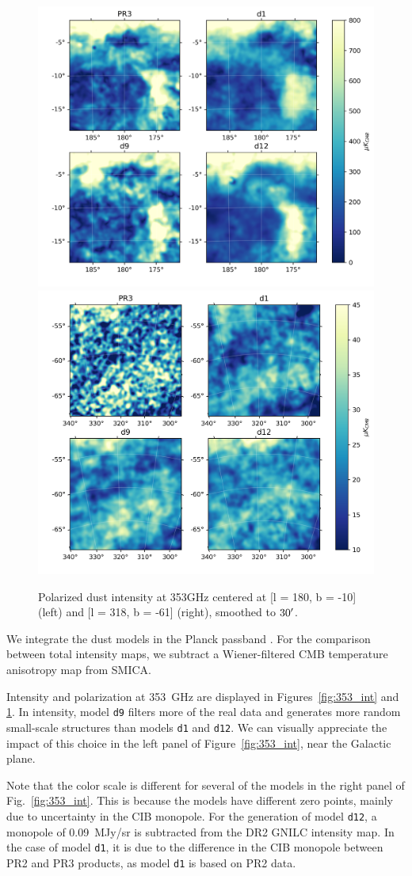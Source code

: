 \documentclass[twocolumn]{aastex631}
\begin{document}
\begin{figure}[t!]
    \centering
    \includegraphics[height=0.41\textwidth]{figures/pol_gal_plane_smooth_30'.png}
    \includegraphics[height=0.41\textwidth]{figures/pol_BK_smooth_30'.png}
    \caption{Polarized dust intensity at 353GHz centered at [l = 180, b = -10] (left) and [l = 318, b = -61] (right), smoothed to $30\mbox{$^\prime$}$.}
    \label{fig:353_pol_int}
\end{figure}

We integrate the dust models in the Planck passband \citep{planck2013-p03d}. For the comparison between total intensity maps, we subtract a Wiener-filtered CMB temperature anisotropy map from SMICA.

Intensity and polarization at 353~GHz are displayed in Figures~\ref{fig:353_int} and \ref{fig:353_pol_int}. 
In intensity, model {\tt d9} filters more of the real data and generates more random small-scale structures than models {\tt d1} and {\tt d12}. We can visually appreciate the impact of this choice in the left panel of Figure~\ref{fig:353_int}, near the Galactic plane. 

Note that the color scale is different for several of the models in the right panel of Fig.~\ref{fig:353_int}. This is because the models have different zero points, mainly due to uncertainty in the CIB monopole. For the generation of model {\tt d12}, a monopole of 0.09~MJy/sr is subtracted from the DR2 GNILC intensity map. In the case of model {\tt d1}, it is due to the difference in the CIB monopole between PR2 and PR3 products, as model {\tt d1} is based on PR2 data.
\end{document}
